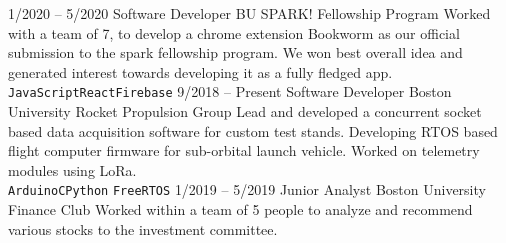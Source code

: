 \documentclass[9pt]{developercv} %
\begin{document}
\begin{entrylist}
	\entry
		{1/2020 -- 5/2020}
		{Software Developer}
		{BU SPARK! Fellowship Program}
		{Worked with a team of 7, to develop a chrome extension Bookworm as our official submission to the spark fellowship program.
		We won best overall idea and generated interest towards developing it as a fully fledged app.\\
		\texttt{JavaScript}\slashsep\texttt{React}\slashsep\texttt{Firebase}}
	\entry
		{9/2018 -- Present}
		{Software Developer}	
		{Boston University Rocket Propulsion Group}
		{Lead and developed a concurrent socket based data acquisition software for custom test stands.
		Developing RTOS based flight computer firmware for sub-orbital launch vehicle. Worked 
		on telemetry modules using LoRa. \\\texttt{Arduino}\slashsep\texttt{C}\slashsep\texttt{Python}
		\slashsep\texttt{FreeRTOS}}
	\entry
		{1/2019 -- 5/2019}
		{Junior Analyst}
		{Boston University Finance Club}
		{Worked within a team of 5 people to analyze and recommend various stocks to the investment committee.}
		
\end{entrylist}
\end{document}
